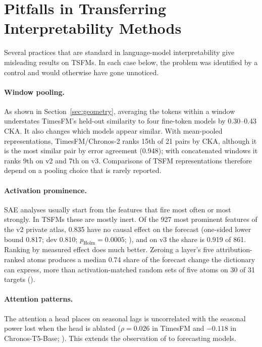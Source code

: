 \section{Pitfalls in Transferring Interpretability Methods}
\label{sec:shortcuts}

Several practices that are standard in language-model interpretability give misleading results on TSFMs. In each case
below, the problem was identified by a control and would otherwise have gone unnoticed.

\paragraph{Window pooling.} As shown in Section~\ref{sec:geometry}, averaging the tokens within a window understates
TimesFM's held-out similarity to four fine-token models by 0.30--0.43 CKA. It also changes which models appear similar.
With mean-pooled representations, TimesFM/Chronos-2 ranks 15th of 21 pairs by CKA, although it is the most similar pair
by error agreement (0.948); with concatenated windows it ranks 9th on v2 and 7th on v3. Comparisons of TSFM
representations therefore depend on a pooling choice that is rarely reported.

\paragraph{Activation prominence.} SAE analyses usually start from the features that fire most often or most strongly.
In TSFMs these are mostly inert. Of the 927 most prominent features of the v2 private atlas, 0.835 have no causal effect
on the forecast (one-sided lower bound 0.817; dev 0.810; $p_{\text{Holm}}=0.0005$; ), and on v3 the share is
0.919 of 861. Ranking by measured effect does much better. Zeroing a layer's five attribution-ranked atoms produces a
median 0.74 share of the forecast change the dictionary can express, more than activation-matched random sets of five
atoms on 30 of 31 targets ().

\paragraph{Attention patterns.} The attention a head places on seasonal lags is uncorrelated with the seasonal power lost
when the head is ablated ($\rho=0.026$ in TimesFM and $-0.118$ in Chronos-T5-Base; ). This extends the
observation of \citet{jain2019attention} to forecasting models.


